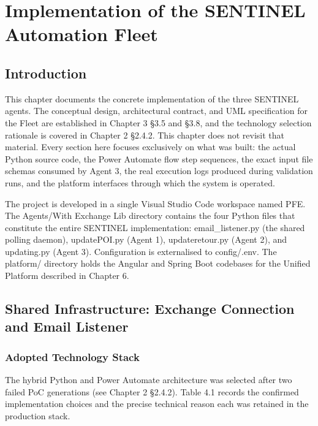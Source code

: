 \chapter{Implementation of the SENTINEL Automation Fleet}

\section*{Introduction}

This chapter documents the concrete implementation of the three SENTINEL agents. The conceptual design, architectural contract, and UML specification for the Fleet are established in Chapter 3 \S{}3.5 and \S{}3.8, and the technology selection rationale is covered in Chapter 2 \S{}2.4.2. This chapter does not revisit that material. Every section here focuses exclusively on what was built: the actual Python source code, the Power Automate flow step sequences, the exact input file schemas consumed by Agent 3, the real execution logs produced during validation runs, and the platform interfaces through which the system is operated.

The project is developed in a single Visual Studio Code workspace named PFE. The Agents/With Exchange Lib directory contains the four Python files that constitute the entire SENTINEL implementation: email\_listener.py (the shared polling daemon), updatePOI.py (Agent 1), updateretour.py (Agent 2), and updating.py (Agent 3). Configuration is externalised to config/.env. The platform/ directory holds the Angular and Spring Boot codebases for the Unified Platform described in Chapter 6.

\section{Shared Infrastructure: Exchange Connection and Email Listener}

\subsection{Adopted Technology Stack}

The hybrid Python and Power Automate architecture was selected after two failed PoC generations (see Chapter 2 \S{}2.4.2). Table 4.1 records the confirmed implementation choices and the precise technical reason each was retained in the production stack.

